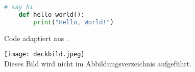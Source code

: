 
\begin{lstlisting}[language=python]
    # say hi
    def hello_world():
        print("Hello, World!")
\end{lstlisting}

Code adaptiert aus \cite[80]{DemoQuelle}.%

\vspace{2em}%

\texttt{[image: deckbild.jpeg]}\\
Dieses Bild wird nicht im Abbildungsverzeichnis aufgeführt.